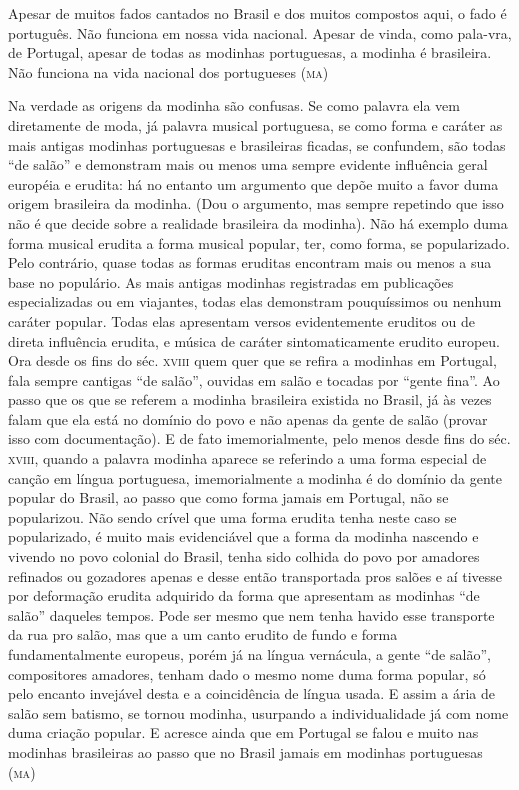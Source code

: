 Apesar de muitos fados cantados no Brasil e dos muitos compostos aqui, o
fado é português. Não funciona em nossa vida nacional. Apesar de vinda,
como pala-vra, de Portugal, apesar de todas as modinhas portuguesas, a
modinha é brasileira. Não funciona na vida nacional dos portugueses (\textsc{ma})

Na verdade as origens da modinha são confusas. Se como palavra ela vem
diretamente de moda, já palavra musical portuguesa, se como forma e
caráter as mais antigas modinhas portuguesas e brasileiras ficadas, se
confundem, são todas ``de salão'' e demonstram mais ou menos uma sempre
evidente influência geral européia e erudita: há no entanto um argumento
que depõe muito a favor duma origem brasileira da modinha. (Dou o
argumento, mas sempre repetindo que isso não é que decide sobre a
realidade brasileira da modinha). Não há exemplo duma forma musical
erudita a forma musical popular, ter, como forma, se popularizado. Pelo
contrário, quase todas as formas eruditas encontram mais ou menos a sua
base no populário. As mais antigas modinhas registradas em publicações
especializadas ou em viajantes, todas elas demonstram pouquíssimos ou
nenhum caráter popular. Todas elas apresentam versos evidentemente
eruditos ou de direta influência erudita, e música de caráter
sintomaticamente erudito europeu. Ora desde os fins do séc. \textsc{xviii} quem
quer que se refira a modinhas em Portugal, fala sempre cantigas ``de
salão'', ouvidas em salão e tocadas por ``gente fina''. Ao passo que os que
se referem a modinha brasileira existida no Brasil, já às vezes falam
que ela está no domínio do povo e não apenas da gente de salão (provar
isso com documentação). E de fato imemorialmente, pelo menos desde fins
do séc. \textsc{xviii}, quando a palavra modinha aparece se referindo a uma forma
especial de canção em língua portuguesa, imemorialmente a modinha é do
domínio da gente popular do Brasil, ao passo que como forma jamais em
Portugal, não se popularizou. Não sendo crível que uma forma erudita
tenha neste caso se popularizado, é muito mais evidenciável que a forma
da modinha nascendo e vivendo no povo colonial do Brasil, tenha sido
colhida do povo por amadores refinados ou gozadores apenas e desse então
transportada pros salões e aí tivesse por deformação erudita adquirido
da forma que apresentam as modinhas ``de salão'' daqueles tempos. Pode
ser mesmo que nem tenha havido esse transporte da rua pro salão, mas que
a um canto erudito de fundo e forma fundamentalmente europeus, porém já
na língua vernácula, a gente ``de salão'', compositores amadores, tenham
dado o mesmo nome duma forma popular, só pelo encanto invejável desta e
a coincidência de língua usada. E assim a ária de salão sem batismo, se
tornou modinha, usurpando a individualidade já com nome duma criação
popular. E acresce ainda que em Portugal se falou e muito nas modinhas
brasileiras ao passo que no Brasil jamais em modinhas portuguesas (\textsc{ma})

